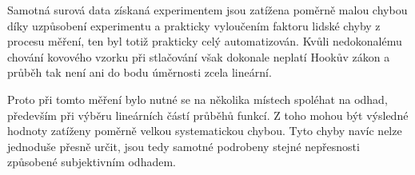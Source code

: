 \documentclass[protokol.tex]{subfiles}
\begin{document}
Samotná surová data získaná experimentem jsou zatížena poměrně malou chybou díky uzpůsobení experimentu a prakticky vyloučením faktoru lidské chyby z procesu měření, ten byl totiž prakticky celý automatizován. Kvůli nedokonalému chování kovového vzorku při stlačování však dokonale neplatí Hookův zákon a průběh tak není ani do bodu úměrnosti zcela lineární.

Proto při tomto měření bylo nutné se na několika místech spoléhat na odhad, především při výběru lineárních částí průběhů funkcí. Z toho mohou být výsledné hodnoty zatíženy poměrně velkou systematickou chybou. Tyto chyby navíc nelze jednoduše přesně určit, jsou tedy samotné podrobeny stejné nepřesnosti způsobené subjektivním odhadem. 
\end{document}
